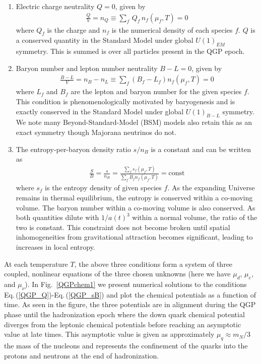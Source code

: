 \documentclass[universe,article,submit,moreauthors,pdftex,a4paper]{Definitions/mdpi}
\newcommand{\req}[1]{Eq.\,(\ref{#1})}
\newcommand*{\rf}[1]{Fig.~{\ref{#1}}}
\begin{document}
\begin{enumerate}
\item Electric charge neutrality $Q=0$, given by
\begin{align}\label{QGP_Q}
 \frac{Q}{V}=n_{Q}\equiv\sum_f\,Q_f\,n_f(\mu_f,T)=0
\end{align}
where $Q_f$ is the charge and $n_{f}$ is the numerical density of each species $f$. $Q$ is a conserved quantity in the Standard Model under global $U(1)_{EM}$ symmetry. This is summed is over all particles present in the QGP epoch.
\item Baryon number and lepton number neutrality $B-L=0$, given by
\begin{align}\label{QGP_LB}
\frac{B-L}{V}=n_{B}-n_{L}\equiv\sum_f(B_f-L_f)n_f(\mu_f,T)=0
\end{align}
where $L_f$ and $B_f$ are the lepton and baryon number for the given species $f$. This condition is phenomenologically motivated by baryogenesis and is exactly conserved in the Standard Model under global $U(1)_{B-L}$ symmetry. We note many Beyond-Standard-Model (BSM) models also retain this as an exact symmetry though Majorana neutrinos do not.
\item The entropy-per-baryon density ratio $s/n_B$ is a constant and can be written as
\begin{align}\label{QGP_sB}
\frac{S}{B}=\frac{s}{n_B}=\frac{\sum_fs_f(\mu_f,T)}{\sum_fB_fn_f(\mu_f,T)}=\mathrm{const}
\end{align}
where $s_f$ is the entropy density of given species $f$. As the expanding Universe remains in thermal equilibrium, the entropy is conserved within a co-moving volume. The baryon number within a co-moving volume is also conserved. As both quantities dilute with $1/a(t)^{3}$ within a normal volume, the ratio of the two is constant. This constraint does not become broken until spatial inhomogeneities from gravitational attraction becomes significant, leading to increases in local entropy.
\end{enumerate}
At each temperature $T$, the above three conditions form a system of three coupled, nonlinear equations of the three chosen unknowns (here we have $\mu_d$, $\mu_e$, and $\mu_\nu$). In \rf{QGPchem1} we present numerical solutions to the conditions \req{QGP_Q}-\req{QGP_sB} and plot the chemical potentials as a function of time. As seen in the figure, the three potentials are in alignment during the QGP phase until the hadronization epoch where the down quark chemical potential diverges from the leptonic chemical potentials before reaching an asymptotic value at late times. This asymptotic value is given as approximately $\mu_{q}\approx m_{N}/3$ the mass of the nucleons and represents the confinement of the quarks into the protons and neutrons at the end of hadronization.
\end{document}
